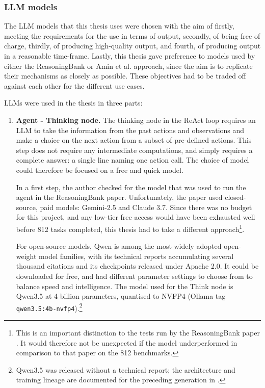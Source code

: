 \subsubsection{LLM models}
The LLM models that this thesis uses were chosen with the aim of firstly, meeting the requirements for the use in terms of output, secondly, of being free of charge, thirdly, of producing high-quality output, and fourth, of producing output in a reasonable time-frame. Lastly, this thesis gave preference to models used by either the ReasoningBank or Amin et al. approach, since the aim is to replicate their mechanisms as closely as possible. These objectives had to be traded off against each other for the different use cases.

LLMs were used in the thesis in three parts:
\begin{enumerate}
    \item \textbf{Agent - Thinking node.} The thinking node in the ReAct loop
    requires an LLM to take the information from the past actions and
    observations and make a choice on the next action from a subset of
    pre-defined actions. This step does not require any intermediate
    computations, and simply requires a complete answer: a single line naming
    one action call. The choice of model could therefore be focused on a free
    and quick model.

    In a first step, the author checked for the model that was used to run the
    agent in the ReasoningBank paper. Unfortunately, the paper used
    closed-source, paid models: Gemini-2.5 and Claude 3.7. Since there was no
    budget for this project, and any low-tier free access would have been
    exhausted well before 812 tasks completed, this thesis had to take a
    different approach\footnote{This is an important distinction to the tests
    run by the ReasoningBank paper \citep{ouyang2025reasoningbank}. It would
    therefore not be unexpected if the model underperformed in comparison to
    that paper on the 812 benchmarks.}.

    For open-source models, Qwen is among the most widely adopted open-weight
    model families, with its technical reports accumulating several thousand
    citations \citep{yang2024qwen25, yang2025qwen3} and its checkpoints
    released under Apache 2.0. It could be downloaded for free, and had
    different parameter settings to choose from to balance speed and
    intelligence. The model used for the Think node is Qwen3.5 at 4 billion
    parameters, quantised to NVFP4 (Ollama tag
    \texttt{qwen3.5:4b-nvfp4}).\footnote{Qwen3.5 was released without a
    technical report; the architecture and training lineage are documented for
    the preceding generation in \citet{yang2025qwen3}.}


\end{enumerate}
